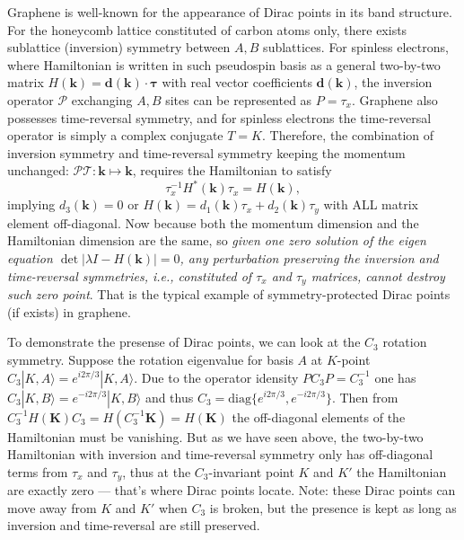             Graphene is well-known for the appearance of Dirac points in its band structure. For the honeycomb lattice constituted of carbon atoms only, there exists sublattice (inversion) symmetry between $A,B$ sublattices. For spinless electrons, where Hamiltonian is written in such pseudospin basis as a general two-by-two matrix $H(\bm k)=\bm d(\bm k)\cdot\bm \tau$ with real vector coefficients $\bm d(\bm k)$, the inversion operator $\mathcal P$ exchanging $A,B$ sites can be represented as $P=\tau_x$. Graphene also possesses time-reversal symmetry, and for spinless electrons the time-reversal operator is simply a complex conjugate $T=K$. Therefore, the combination of inversion symmetry and time-reversal symmetry keeping the momentum unchanged: $\mathcal P\mathcal T:\bm k\mapsto\bm k$, requires the Hamiltonian to satisfy 
            \begin{equation*}
                \tau_x^{-1}H^*(\bm k)\tau_x=H(\bm k),
            \end{equation*}
            implying $d_3(\bm k)=0$ or $H(\bm k)=d_1(\bm k)\tau_x+d_2(\bm k)\tau_y$ with ALL matrix element off-diagonal. Now because both the momentum dimension and the Hamiltonian dimension are the same, so \emph{given one zero solution of the eigen equation $\det|\lambda I-H(\bm k)|=0$, any perturbation preserving the inversion and time-reversal symmetries, i.e., constituted of $\tau_x$ and $\tau_y$ matrices, cannot destroy such zero point}. That is the typical example of symmetry-protected Dirac points (if exists) in graphene.

            To demonstrate the presense of Dirac points, we can look at the $C_3$ rotation symmetry. Suppose the rotation eigenvalue for basis $A$ at $K$-point $C_3|K,A\rangle=e^{i2\pi/3}|K,A\rangle$. Due to the operator idensity $PC_3P=C_3^{-1}$ one has $C_3|K,B\rangle=e^{-i2\pi/3}|K,B\rangle$ and thus $C_3=\mathrm{diag}\{e^{i2\pi/3},e^{-i2\pi/3}\}$. Then from $C_3^{-1}H(\bm K)C_3=H(C_3^{-1}\bm K)=H(\bm K)$ the off-diagonal elements of the Hamiltonian must be vanishing. But as we have seen above, the two-by-two Hamiltonian with inversion and time-reversal symmetry only has off-diagonal terms from $\tau_x$ and $\tau_y$, thus at the $C_3$-invariant point $K$ and $K'$ the Hamiltonian are exactly zero --- that's where Dirac points locate. Note: these Dirac points can move away from $K$ and $K'$ when $C_3$ is broken, but the presence is kept as long as inversion and time-reversal are still preserved. 
            

